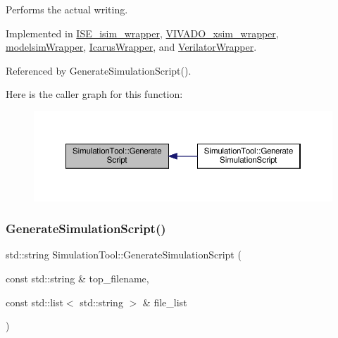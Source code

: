 Performs the actual writing. 



Implemented in \hyperlink{classISE__isim__wrapper_a7f67c0aa82f1959d7327f05cb4504477}{I\+S\+E\+\_\+isim\+\_\+wrapper}, \hyperlink{classVIVADO__xsim__wrapper_adc04b335afab76135cd6b33997db4203}{V\+I\+V\+A\+D\+O\+\_\+xsim\+\_\+wrapper}, \hyperlink{classmodelsimWrapper_a5eaa08f8c0b15b12a72046e04f290b86}{modelsim\+Wrapper}, \hyperlink{classIcarusWrapper_adf6d3591e5e20f081e89122563c04176}{Icarus\+Wrapper}, and \hyperlink{classVerilatorWrapper_a4f67b56da53843f72ba663dfee9a2b5a}{Verilator\+Wrapper}.



Referenced by Generate\+Simulation\+Script().

Here is the caller graph for this function\+:
\nopagebreak
\begin{figure}[H]
\begin{center}
\leavevmode
\includegraphics[width=350pt]{d5/dfc/classSimulationTool_afd99529bb7adb46081071097ceae7643_icgraph}
\end{center}
\end{figure}
\mbox{\label{classSimulationTool_a7fde58cff0f6cf25ae672c148e708c06}} 
\subsubsection{\texorpdfstring{Generate\+Simulation\+Script()}{GenerateSimulationScript()}}
{\footnotesize\ttfamily std\+::string Simulation\+Tool\+::\+Generate\+Simulation\+Script (\begin{DoxyParamCaption}\item[{const std\+::string \&}]{top\+\_\+filename,  }\item[{const std\+::list$<$ std\+::string $>$ \&}]{file\+\_\+list }\end{DoxyParamCaption})\hspace{0.3cm}{\ttfamily [virtual]}}




